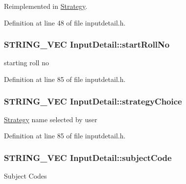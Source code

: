 \-Reimplemented in \hyperlink{classStrategy_a190510a0a4957ac947ce5a09d2f7dad8}{\-Strategy}.



\-Definition at line 48 of file inputdetail.\-h.

\hypertarget{classInputDetail_a7262436753ac62bf068cc23b97049f61}{
\subsubsection[{start\-Roll\-No}]{\setlength{\rightskip}{0pt plus 5cm}\-S\-T\-R\-I\-N\-G\-\_\-\-V\-E\-C {\bf \-Input\-Detail\-::start\-Roll\-No}}}\label{db/d6e/classInputDetail_a7262436753ac62bf068cc23b97049f61}
starting roll no 

\-Definition at line 85 of file inputdetail.\-h.

\hypertarget{classInputDetail_acbdbb6ecb850dec574b5878764c56c88}{
\subsubsection[{strategy\-Choice}]{\setlength{\rightskip}{0pt plus 5cm}\-S\-T\-R\-I\-N\-G\-\_\-\-V\-E\-C {\bf \-Input\-Detail\-::strategy\-Choice}}}\label{db/d6e/classInputDetail_acbdbb6ecb850dec574b5878764c56c88}
\hyperlink{classStrategy}{\-Strategy} name selected by user 

\-Definition at line 85 of file inputdetail.\-h.

\hypertarget{classInputDetail_ab391f03f242defb952e24a584eefdb35}{
\subsubsection[{subject\-Code}]{\setlength{\rightskip}{0pt plus 5cm}\-S\-T\-R\-I\-N\-G\-\_\-\-V\-E\-C {\bf \-Input\-Detail\-::subject\-Code}}}\label{db/d6e/classInputDetail_ab391f03f242defb952e24a584eefdb35}
\-Subject \-Codes 

